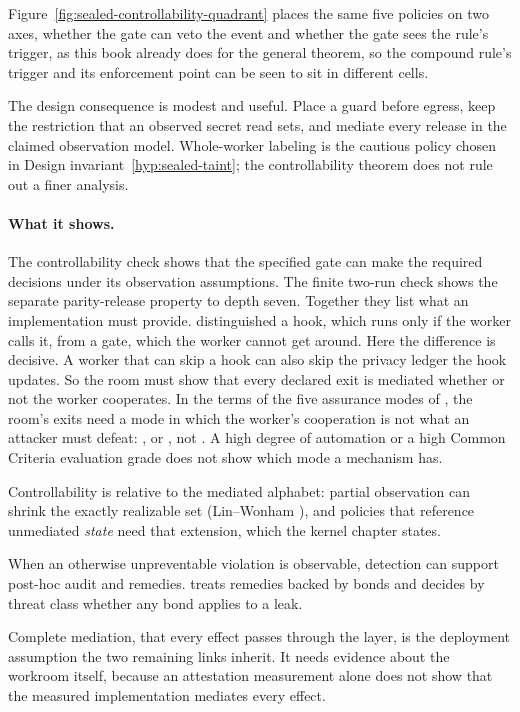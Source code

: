 \documentclass[11pt,a4paper]{article}
\theoremstyle{definition}
\begin{document}
Figure~\ref{fig:sealed-controllability-quadrant} places the same five
policies on two axes, whether the gate can veto the event and whether the
gate sees the rule's trigger, as this book already does for the general
theorem, so the compound rule's trigger and its enforcement point can be
seen to sit in different cells.



The design consequence is modest and useful. Place a guard before egress,
keep the restriction that an observed secret read sets, and mediate every
release in the claimed observation model. Whole-worker labeling is the
cautious policy chosen in Design invariant~\ref{hyp:sealed-taint}; the
controllability theorem does not rule out a finer analysis.

\paragraph{What it shows.}
The controllability check shows that the specified gate can make the required
decisions under its observation assumptions. The finite two-run check shows
the separate parity-release property to depth seven. Together they list what
an implementation must provide.
 distinguished a hook, which runs
only if the worker calls it, from a gate, which the worker cannot get around.
Here the difference is decisive. A worker that can skip a hook can also skip
the privacy ledger the hook updates. So the room must show that every declared
exit is mediated whether or not the worker cooperates. In the terms of the
five assurance modes of , the room's
exits need a mode in which the worker's cooperation is not what an attacker
must defeat: ,  or
, not . A high degree of
automation or a high Common Criteria evaluation grade does not show which mode
a mechanism has.

\begin{pdboundary}
\setlength{\parskip}{4pt plus 1pt}
Controllability is relative to the mediated alphabet: partial observation
can shrink the exactly realizable set (Lin--Wonham ), and policies that
reference unmediated \emph{state} need that extension, which the kernel chapter
states.

When an otherwise unpreventable violation is observable, detection can
support post-hoc audit and remedies. 
treats remedies backed by bonds and decides by threat class whether any bond
applies to a leak.

Complete mediation, that every effect passes through the layer, is the
deployment assumption the two remaining links inherit. It needs evidence
about the workroom itself, because an attestation measurement alone does not
show that the measured implementation mediates every effect.
\end{pdboundary}
\end{document}
